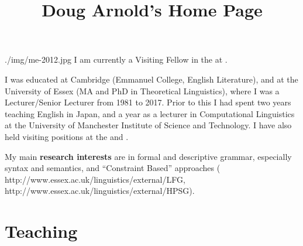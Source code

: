\documentclass[a4paper]{article}
\title{%
        Doug Arnold's Home Page
      }
\date{}
\author{\MyEmail}
\begin{document}
\maketitle

      {./img/me-2012.jpg}
I am currently a Visiting Fellow in the  at 
. 

I was educated at Cambridge (Emmanuel College, English Literature), and at the
University of Essex (MA and PhD in Theoretical Linguistics), where I was a
Lecturer/Senior Lecturer from 1981 to 2017. Prior to this I had spent two years teaching English
in Japan, and a year as a lecturer in Computational Linguistics at
the University of Manchester Institute of Science and Technology. I have also held visiting positions at the  and . 

My main \textbf{research interests} are in formal and descriptive grammar, especially
syntax and semantics, and 
``Constraint Based'' approaches 
(
          {http://www.essex.ac.uk/linguistics/external/LFG},
          {http://www.essex.ac.uk/linguistics/external/HPSG}).




\section{Teaching}
\end{document}

